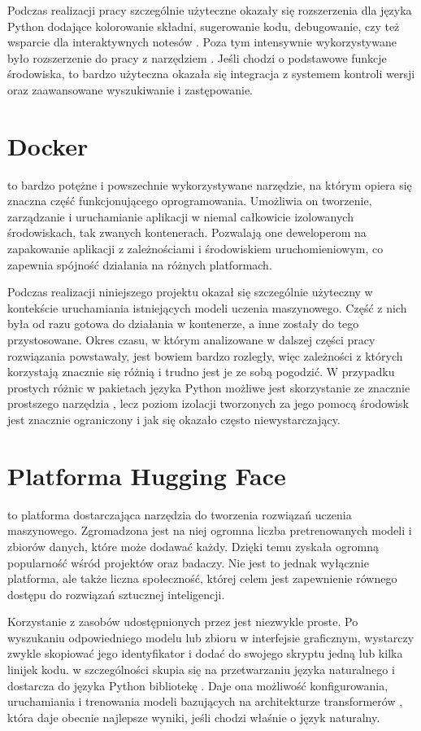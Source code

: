 Podczas realizacji pracy szczególnie użyteczne okazały się rozszerzenia dla języka Python dodające kolorowanie składni, sugerowanie kodu, debugowanie, czy też wsparcie dla interaktywnych notesów . Poza tym intensywnie wykorzystywane było rozszerzenie do pracy z narzędziem . Jeśli chodzi o podstawowe funkcje środowiska, to bardzo użyteczna okazała się integracja z systemem kontroli wersji oraz zaawansowane wyszukiwanie i zastępowanie.

\section{Docker}
 to bardzo potężne i powszechnie wykorzystywane narzędzie, na którym opiera się znaczna część funkcjonującego oprogramowania. Umożliwia on tworzenie, zarządzanie i uruchamianie aplikacji w niemal całkowicie izolowanych środowiskach, tak zwanych kontenerach. Pozwalają one deweloperom na zapakowanie aplikacji z zależnościami i środowiskiem uruchomieniowym, co zapewnia spójność działania na różnych platformach.

Podczas realizacji niniejszego projektu  okazał się szczególnie użyteczny w kontekście uruchamiania istniejących modeli uczenia maszynowego. Część z nich była od razu gotowa do działania w kontenerze, a inne zostały do tego przystosowane. Okres czasu, w którym analizowane w dalszej części pracy rozwiązania powstawały, jest bowiem bardzo rozległy, więc zależności z których korzystają znacznie się różnią i trudno jest je ze sobą pogodzić. W przypadku prostych różnic w pakietach języka Python możliwe jest skorzystanie ze znacznie prostszego narzędzia , lecz poziom izolacji tworzonych za jego pomocą środowisk jest znacznie ograniczony i jak się okazało często niewystarczający.

\section{Platforma Hugging Face}
 to platforma dostarczająca narzędzia do tworzenia rozwiązań uczenia maszynowego. Zgromadzona jest na niej ogromna liczba pretrenowanych modeli i zbiorów danych, które może dodawać każdy. Dzięki temu zyskała ogromną popularność wśród projektów  oraz badaczy. Nie jest to jednak wyłącznie platforma, ale także liczna społeczność, której celem jest zapewnienie równego dostępu do rozwiązań sztucznej inteligencji.

Korzystanie z zasobów udostępnionych przez  jest niezwykle proste. Po wyszukaniu odpowiedniego modelu lub zbioru w interfejsie graficznym, wystarczy zwykle skopiować jego identyfikator i dodać do swojego skryptu jedną lub kilka linijek kodu.  w szczególności skupia się na przetwarzaniu języka naturalnego i dostarcza do języka Python bibliotekę . Daje ona możliwość konfigurowania, uruchamiania i trenowania modeli bazujących na architekturze transformerów , która daje obecnie najlepsze wyniki, jeśli chodzi właśnie o język naturalny. 
